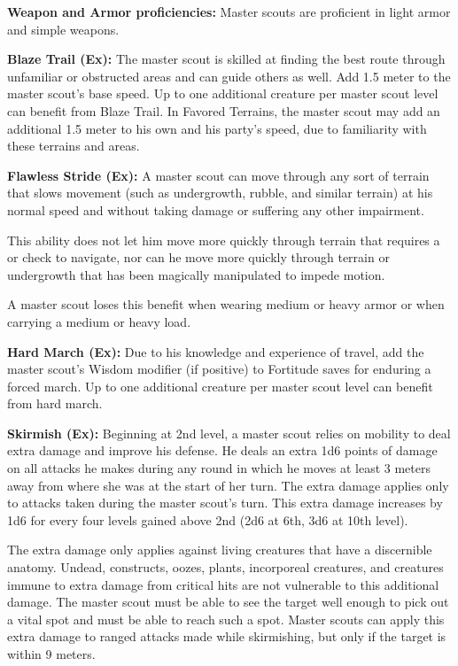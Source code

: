 {
\textbf{Weapon and Armor proficiencies:} Master scouts are proficient in light armor and simple weapons.

\textbf{Blaze Trail (Ex):} The master scout is skilled at finding the best route through unfamiliar or obstructed areas and can guide others as well. Add 1.5 meter to the master scout's base speed. Up to one additional creature per master scout level can benefit from Blaze Trail. In Favored Terrains, the master scout may add an additional 1.5 meter to his own and his party's speed, due to familiarity with these terrains and areas.


\textbf{Flawless Stride (Ex):} A master scout can move through any sort of terrain that slows movement (such as undergrowth, rubble, and similar terrain) at his normal speed and without taking damage or suffering any other impairment.

This ability does not let him move more quickly through terrain that requires a  or  check to navigate, nor can he move more quickly through terrain or undergrowth that has been magically manipulated to impede motion.

A master scout loses this benefit when wearing medium or heavy armor or when carrying a medium or heavy load.

\textbf{Hard March (Ex):} Due to his knowledge and experience of travel, add the master scout's Wisdom modifier (if positive) to Fortitude saves for enduring a forced march. Up to one additional creature per master scout level can benefit from hard march.

\textbf{Skirmish (Ex):} Beginning at 2nd level, a master scout relies on mobility to deal extra damage and improve his defense. He deals an extra 1d6 points of damage on all attacks he makes during any round in which he moves at least 3 meters away from where she was at the start of her turn. The extra damage applies only to attacks taken during the master scout's turn. This extra damage increases by 1d6 for every four levels gained above 2nd (2d6 at 6th, 3d6 at 10th level).

The extra damage only applies against living creatures that have a discernible anatomy. Undead, constructs, oozes, plants, incorporeal creatures, and creatures immune to extra damage from critical hits are not vulnerable to this additional damage. The master scout must be able to see the target well enough to pick out a vital spot and must be able to reach such a spot. Master scouts can apply this extra damage to ranged attacks made while skirmishing, but only if the target is within 9 meters.

}
